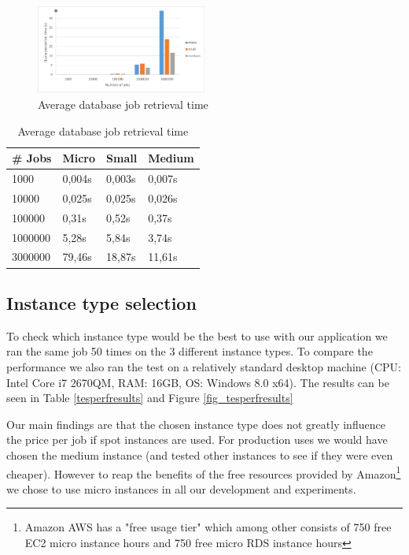 \documentclass[a4paper]{IEEEtran}
\begin{document}
\begin{figure}
\centering
\includegraphics[width=0.5\textwidth]{"results-database"}
\caption{Average database job retrieval time}
\label{fig_dbperfresults}
\end{figure}

\begin{table}
\caption{Average database job retrieval time}
\label{dbperfresults}
\centering
\begin{tabular}{| l | l | l | l |}
\hline
\# Jobs & Micro & Small & Medium \\ \hline
1000 & 0,004s &	0,003s & 0,007s \\ \hline
10000 & 0,025s & 0,025s & 0,026s \\ \hline
100000 & 0,31s & 0,52s & 0,37s \\ \hline
1000000 & 5,28s & 5,84s & 3,74s \\ \hline
3000000	& 79,46s & 18,87s & 11,61s \\ \hline
\end{tabular}
\end{table}

\subsection{Instance type selection}

To check which instance type would be the best to use with our application we ran the same job 50 times on the 3 different instance types. To compare the performance we also ran the test on a relatively standard desktop machine (CPU: Intel Core i7 2670QM, RAM: 16GB, OS: Windows 8.0 x64). The results can be seen in Table \ref{tesperfresults} and Figure \ref{fig_tesperfresults}

Our main findings are that the chosen instance type does not greatly influence the price per job if spot instances are used. For production uses we would have chosen the medium instance (and tested other instances to see if they were even cheaper). However to reap the benefits of the free resources provided by Amazon\footnote{Amazon AWS has a "free usage tier" which among other consists of 750 free EC2 micro instance hours and 750 free micro RDS instance hours} we chose to use micro instances in all our development and experiments.
\end{document}
